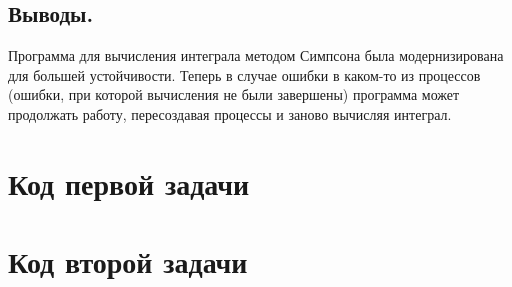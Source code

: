 \documentclass{article}
\begin{document}
\subsection{Выводы.}
Программа для вычисления интеграла методом Симпсона была модернизирована для большей устойчивости. Теперь в случае ошибки в каком-то из процессов (ошибки, при которой вычисления не были завершены) программа может продолжать работу, пересоздавая процессы и заново вычисляя интеграл.

\section{Код первой задачи}\label{code_1}


\section{Код второй задачи}\label{code_2}

\end{document}
